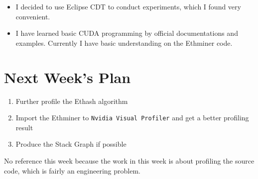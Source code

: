 \documentclass[11pt]{article}
\begin{document}
\begin{itemize}
\item I decided to use Eclipse CDT to conduct experiments, which I found very convenient.
\item I have learned basic CUDA programming by official documentations and examples. Currently I have basic understanding on the Ethminer code.
\end{itemize}
%
%
\section{Next Week's Plan}
\begin{enumerate}
\item Further profile the Ethash algorithm
\item Import the Ethminer to \texttt{Nvidia Visual Profiler} and get a better profiling result
\item Produce the Stack Graph if possible
\end{enumerate}

No reference this week because the work in this week is about profiling the source code, which is fairly an engineering problem.

%
%
\end{document}

